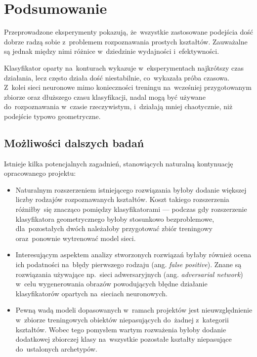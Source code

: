 \documentclass[11pt,a4paper]{article}
\begin{document}
\section{Podsumowanie}

Przeprowadzone eksperymenty pokazują, że~wszystkie zastosowane podejścia dość dobrze radzą sobie z~problemem rozpoznawania prostych kształtów.
Zauważalne są jednak między nimi różnice w~dziedzinie wydajności i~efektywności.

Klasyfikator oparty na~konturach wykazuje w~eksperymentach najkrótszy czas działania, lecz często działa dość niestabilnie, co~wykazała próba czasowa.
Z~kolei sieci neuronowe mimo konieczności treningu na~wcześniej przygotowanym zbiorze oraz dłuższego czasu klasyfikacji, nadal mogą być używane do~rozpoznawania w~czasie rzeczywistym, i~działają mniej chaotycznie, niż podejście typowo geometryczne.

\subsection{Możliwości dalszych badań}

Istnieje kilka potencjalnych zagadnień, stanowiących naturalną kontynuację opracowanego projektu:

\begin{itemize}
    \item Naturalnym rozszerzeniem istniejącego rozwiązania byłoby dodanie większej liczby rodzajów rozpoznawanych kształtów.
    Koszt takiego rozszerzenia różniłby~się znacząco pomiędzy klasyfikatorami --- podczas gdy rozszerzenie klasyfikatora geometrycznego byłoby stosunkowo bezproblemowe, dla~pozostałych dwóch należałoby przygotować zbiór treningowy oraz~ponownie wytrenować model sieci.
    \item Interesującym aspektem analizy stworzonych rozwiązań byłaby również ocena ich podatności na~błędy pierwszego rodzaju (ang. \emph{false positive}).
    Znane są rozwiązania używające np.~sieci adwersaryjnych (ang. \emph{adversarial network}) w~celu wygenerowania obrazów powodujących błędne działanie klasyfikatorów opartych na~sieciach neuronowych.
    \item Pewną wadą modeli dopasowanych w~ramach projektów jest nieuwzględnienie w~zbiorze treningowych obiektów niepasujących do~żadnej z~kategorii kształtów.
    Wobec tego pomysłem wartym rozważenia byłoby dodanie dodatkowej zbiorczej klasy na~wszystkie pozostałe kształty niepasujące do~ustalonych archetypów.
\end{itemize}
\end{document}
